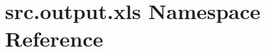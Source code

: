 \hypertarget{namespacesrc_1_1output_1_1xls}{\section{src.\+output.\+xls Namespace Reference}
\label{namespacesrc_1_1output_1_1xls}
}
